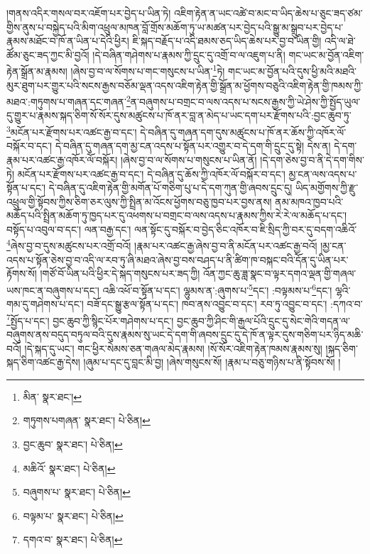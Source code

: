 །གནས་འདིར་གསལ་བར་འཇོག་པར་བྱེད་པ་ཡིན་ཏེ། འཇིག་རྟེན་ན་ཡང་འཚེ་བ་མང་བ་ཡིད་ཆེས་པ་ཅུང་ཟད་ཙམ་གྱིས་ནུས་པ་བསྐྱེད་པའི་མིག་འཕྲུལ་མཁན་བློ་གྲོས་མཆོག་ཏུ་ཡ་མཚན་པར་བྱེད་པའི་སྒྱུ་མ་སྒྲུབ་པར་བྱེད་པ་རྣམས་མཐོང་བ་ཁོ་ན་ཡིན་པ་དེའི་ཕྱིར། ཇི་སྐད་བརྗོད་པ་འདི་ཐམས་ཅད་ཡིད་ཆེས་པར་བྱ་བ་ཡིན་གྱི། འདི་ལ་ཐེ་ཚོམ་ཅུང་ཟད་ཀྱང་མི་བྱའོ། །དེ་བཞིན་གཤེགས་པ་རྣམས་ཀྱི་དྲུང་དུ་འགྲོ་བ་ལ་འཇུག་པ་ནི། གང་ཡང་མ་བྱོན་འཇིག་རྟེན་སྒྲོན་མ་རྣམས། །ཞེས་བྱ་བ་ལ་སོགས་པ་གང་གསུངས་པ་ཡིན་\footnote{མིན་  སྣར་ཐང་། }ཏེ། གང་ཡང་མ་བྱོན་པའི་དུས་ཕྱི་མའི་མཐའི་མུར་ཐུག་པར་གྱུར་པའི་སངས་རྒྱས་བཅོམ་ལྡན་འདས་འཇིག་རྟེན་གྱི་སྒྲོན་མ་ཕྱོགས་བཅུའི་འཇིག་རྟེན་གྱི་ཁམས་ཀྱི་མཐའ་:གཏུགས་པ་གཞན་དང་གཞན་\footnote{གཏུགས་པགཞན་  སྣར་ཐང་།  པེ་ཅིན། }ན་བཞུགས་པ་བགྲང་བ་ལས་འདས་པ་སངས་རྒྱས་ཀྱི་ཡེ་ཤེས་ཀྱི་སྤྱོད་ཡུལ་དུ་གྱུར་པ་རྣམས་སྐད་ཅིག་སོ་སོར་དུས་མཚུངས་པ་ཁོ་ནར་བླ་ན་མེད་པ་ཡང་དག་པར་རྫོགས་པའི་:བྱང་ཆུབ་ཏུ་\footnote{བྱང་ཆུབ་  སྣར་ཐང་།  པེ་ཅིན། }མངོན་པར་རྫོགས་པར་འཚང་རྒྱ་བ་དང་། དེ་བཞིན་དུ་གཞན་དག་དུས་མཚུངས་པ་ཁོ་ནར་ཆོས་ཀྱི་འཁོར་ལོ་བསྐོར་བ་དང་། དེ་བཞིན་དུ་གཞན་དག་མྱ་ངན་འདས་པ་སྟོན་པར་འགྱུར་བ་དེ་དག་གི་དྲུང་དུ་སྟེ། དེས་ན། དེ་དག་རྣམ་པར་འཚང་རྒྱ་འཁོར་ལོ་བསྐོར། །ཞེས་བྱ་བ་ལ་སོགས་པ་གསུངས་པ་ཡིན་ནོ། །དེ་དག་ཅེས་བྱ་བ་ནི་དེ་དག་གིས་ཏེ། མངོན་པར་རྫོགས་པར་འཚང་རྒྱ་བ་དང་། དེ་བཞིན་དུ་ཆོས་ཀྱི་འཁོར་ལོ་བསྐོར་བ་དང་། མྱ་ངན་ལས་འདས་པ་སྟོན་པ་དང་། དེ་བཞིན་དུ་འཇིག་རྟེན་གྱི་མགོན་པོ་གཅིག་པུ་པ་དེ་དག་ཀུན་གྱི་ཞབས་དྲུང་དུ། ཡིད་མགྱོགས་ཀྱི་རྫུ་འཕྲུལ་གྱི་སྟོབས་ཀྱིས་ཅིག་ཅར་ལུས་ཀྱི་སྤྲིན་མ་འོངས་ཕྱོགས་བཅུ་ཁྱབ་པར་བྱས་ནས། ནམ་མཁའ་ཁྱབ་པའི་མཆོད་པའི་སྤྲིན་མཆོག་ཏུ་ཁྱད་པར་དུ་འཕགས་པ་བགྲང་བ་ལས་འདས་པ་རྣམས་ཀྱིས་རེ་རེ་ལ་མཆོད་པ་དང་། བསྟོད་པ་འབུལ་བ་དང་། ལན་བརྒྱ་དང་། ལན་སྟོང་དུ་བསྐོར་བ་བྱེད་ཅིང་འཁོར་བ་ཇི་སྲིད་ཀྱི་བར་དུ་བདག་འཆིའོ་\footnote{མཆིའོ་  སྣར་ཐང་།  པེ་ཅིན། }ཞེས་བྱ་བ་དུས་མཚུངས་པར་འགྲོ་བའོ། །རྣམ་པར་འཚང་རྒྱ་ཞེས་བྱ་བ་ནི་མངོན་པར་འཚང་རྒྱ་བའོ། །མྱ་ངན་འདས་པ་སྟོན་ཅེས་བྱ་བ་འདི་ལ་རབ་ཏུ་ཞི་མཐའ་ཞེས་བྱ་བས་བཤད་པ་ནི་ཚིག་ཁ་བསྐང་བའི་དོན་དུ་ཡིན་པར་རྟོགས་སོ། །གཙོ་བོ་ཡིན་པའི་ཕྱིར་དེ་སྐད་གསུངས་པར་ཟད་ཀྱི། འོན་ཀྱང་ཆུ་ཟླ་སྣང་བ་ལྟར་དགའ་ལྡན་གྱི་གཞལ་ཡས་ཁང་ན་བཞུགས་པ་དང་། འཆི་འཕོ་བ་སྟོན་པ་དང་། ལྷུམས་ན་:ཞུགས་པ་\footnote{བཞུགས་པ་  སྣར་ཐང་།  པེ་ཅིན། }དང་། :བལྟམས་པ་\footnote{བལྟམ་པ་  སྣར་ཐང་།  པེ་ཅིན། }དང་། ལྷའི་གམ་དུ་གཤེགས་པ་དང་། བཟོ་དང་སྒྱུ་རྩལ་སྟོན་པ་དང་། ཁབ་ནས་འབྱུང་བ་དང་། རབ་ཏུ་འབྱུང་བ་དང་། :དཀའ་བ་\footnote{དགའ་བ་  སྣར་ཐང་།  པེ་ཅིན། }སྤྱོད་པ་དང་། བྱང་ཆུབ་ཀྱི་སྙིང་པོར་གཤེགས་པ་དང་། བྱང་ཆུབ་ཀྱི་ཤིང་གི་རྒྱལ་པོའི་དྲུང་དུ་སེང་གེའི་གདན་ལ་བཞུགས་ནས་བདུད་བཏུལ་བའི་དུས་རྣམས་སུ་ཡང་དེ་དག་གི་ཞབས་དྲུང་དུ་དེ་ཁོ་ན་ལྟར་དུས་གཅིག་པར་ཉིད་མཆི་བའོ། །དེ་སྐད་དུ་ཡང་། གང་ཕྱིར་སེམས་ཅན་གཞལ་མེད་རྣམས། །སོ་སོར་འཇིག་རྟེན་ཁམས་རྣམས་སུ། །སྐད་ཅིག་སྐད་ཅིག་འཚང་རྒྱ་དེས། །ཞུམ་པ་དང་དུ་བླང་མི་བྱ། །ཞེས་གསུངས་སོ། །རྣམ་པ་བཅུ་གཉིས་པ་ནི་སྟོབས་སོ། །
